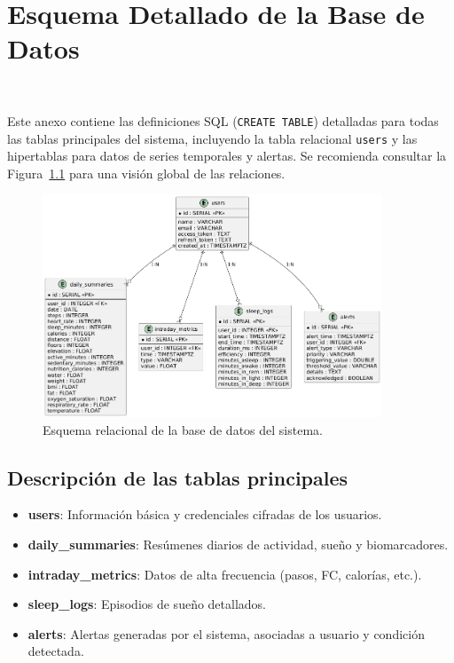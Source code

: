 
\chapter{Esquema Detallado de la Base de Datos} 
\label{app:db_schema} %

Este anexo contiene las definiciones SQL (\texttt{CREATE TABLE}) detalladas para todas las tablas principales del sistema, incluyendo la tabla relacional \texttt{users} y las hipertablas para datos de series temporales y alertas. Se recomienda consultar la Figura~\ref{fig:esquema_relacional} para una visión global de las relaciones.

\begin{figure}[htbp]
    \centering
    \includegraphics[width=0.9\textwidth]{imagenes/esquema_relacional.png}
    \caption{Esquema relacional de la base de datos del sistema.}
    \label{fig:esquema_relacional}
\end{figure}

\section*{Descripción de las tablas principales}
\begin{itemize}
    \item \textbf{users}: Información básica y credenciales cifradas de los usuarios.
    \item \textbf{daily\_summaries}: Resúmenes diarios de actividad, sueño y biomarcadores.
    \item \textbf{intraday\_metrics}: Datos de alta frecuencia (pasos, FC, calorías, etc.).
    \item \textbf{sleep\_logs}: Episodios de sueño detallados.
    \item \textbf{alerts}: Alertas generadas por el sistema, asociadas a usuario y condición detectada.
\end{itemize}

